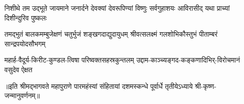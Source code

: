 
\addtocounter{shlokacount}{7}
\threelineshloka
{निशीथे तम उद्भूते जायमाने जनार्दने}
{देवक्यां देवरूपिण्यां विष्णुः सर्वगुहाशयः}
{आविरासीद् यथा प्राच्यां दिशीन्दुरिव पुष्कलः}

\fourlineindentedshloka
{तमद्भुतं बालकमम्बुजेक्षणं}
{चतुर्भुजं शङ्खगदाद्युदायुधम्}
{श्रीवत्सलक्ष्मं गलशोभिकौस्तुभं}
{पीताम्बरं सान्द्रपयोदसौभगम्}


\fourlineindentedshloka
{महार्ह-वैदूर्य-किरीट-कुण्डल-}{त्विषा परिष्वक्तसहस्रकुन्तलम्}
{उद्दाम-काञ्च्यङ्गद-कङ्कणादिभिर्-}{विरोचमानं वसुदेव ऐक्षत}

॥इति श्रीमद्भागवते महापुराणे पारमहंस्यां संहितायां दशमस्कन्धे पूर्वार्धे तृतीयेऽध्याये श्री-कृष्ण-जन्मानुवर्णनम्॥
